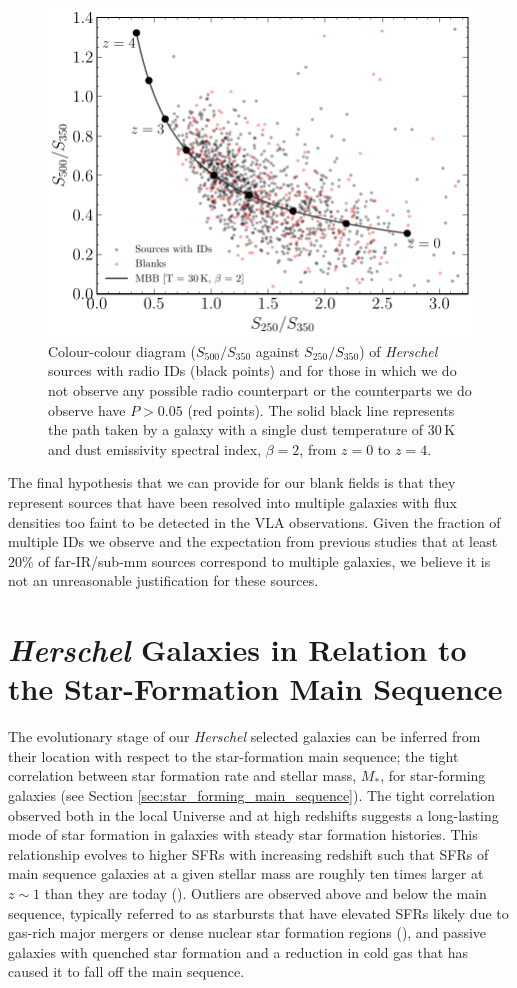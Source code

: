 \begin{figure}
	\centering
	\includegraphics[width=0.75\columnwidth]{Figures/Figure_5_8.pdf}
	\caption[$S_{500}/S_{350}$ against $S_{250}/S_{350}$ plot of sources with and without radio IDs]{Colour-colour diagram ($S_{500}/S_{350}$ against $S_{250}/S_{350}$) of \textit{Herschel} sources with radio IDs (black points) and for those in which we do not observe any possible radio counterpart or the counterparts we do observe have $P > 0.05$ (red points). The solid black line represents the path taken by a galaxy with a single dust temperature of $30\,$K and dust emissivity spectral index, $\beta = 2$, from $z = 0$ to $z = 4$.}
	\label{fig:blank_fir_colours}
\end{figure}

The final hypothesis that we can provide for our blank fields is that they represent sources that have been resolved into multiple galaxies with flux densities too faint to be detected in the VLA observations. Given the fraction of multiple IDs we observe and the expectation from previous studies that at least $20\%$ of far-IR/sub-mm sources correspond to multiple galaxies, we believe it is not an unreasonable justification for these sources.

\section{\textit{Herschel} Galaxies in Relation to the Star-Formation Main Sequence}

The evolutionary stage of our \textit{Herschel} selected galaxies can be inferred from their location with respect to the star-formation main sequence; the tight correlation between star formation rate and stellar mass, $M_*$, for star-forming galaxies (see Section \ref{sec:star_forming_main_sequence}). The tight correlation observed both in the local Universe and at high redshifts suggests a long-lasting mode of star formation in galaxies with steady star formation histories. This relationship evolves to higher SFRs with increasing redshift such that SFRs of main sequence galaxies at a given stellar mass are roughly ten times larger at $z\sim1$ than they are today (\citealt{Noeske_2007}). Outliers are observed above and below the main sequence, typically referred to as starbursts that have elevated SFRs likely due to gas-rich major mergers or dense nuclear star formation regions (\citealt{Daddi_2010}), and passive galaxies with quenched star formation and a reduction in cold gas that has caused it to fall off the main sequence.

